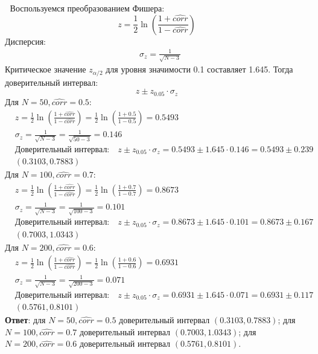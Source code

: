 \documentclass{assignment}
\begin{document}
\begin{enumerate}
\begin{itemize}
    \end{itemize}
    \textcolor{white}{.}
    \start
    Воспользуемся преобразованием Фишера:
    \begin{equation}
        z = \frac{1}{2}\ln (\frac{1+\hat{corr}}{1-\hat{corr}})
    \end{equation}
    Дисперсия:
    \begin{align*}
        &\sigma_z = \frac{1}{\sqrt{N-3}}
    \end{align*}
    Критическое значение $z_{\alpha/2}$ для уровня значимости 0.1 составляет 1.645. Тогда доверительный интервал:
    \begin{equation}
        z \pm z_{0.05}\cdot \sigma_z
    \end{equation}
    Для $N = 50, \hat{corr} = 0.5$:
    \begin{align*}
        &z = \frac{1}{2}\ln (\frac{1+\hat{corr}}{1-\hat{corr}}) = \frac{1}{2}\ln (\frac{1+0.5}{1-0.5}) = 0.5493 \\
        &\sigma_z = \frac{1}{\sqrt{N-3}} = \frac{1}{\sqrt{50-3}} = 0.146 \\
        &\text{Доверительный интервал:}\quad z \pm z_{0.05}\cdot \sigma_z = 0.5493 \pm 1.645 \cdot 0.146 = 0.5493 \pm 0.239 \\
        &(0.3103, 0.7883)
    \end{align*}
    Для $N = 100, \hat{corr} = 0.7$:
    \begin{align*}
        &z = \frac{1}{2}\ln (\frac{1+\hat{corr}}{1-\hat{corr}}) = \frac{1}{2}\ln (\frac{1+0.7}{1-0.7}) = 0.8673 \\
        &\sigma_z = \frac{1}{\sqrt{N-3}} = \frac{1}{\sqrt{100-3}} = 0.101 \\
        &\text{Доверительный интервал:}\quad z \pm z_{0.05}\cdot \sigma_z = 0.8673 \pm 1.645 \cdot 0.101 = 0.8673 \pm 0.167 \\
        &(0.7003, 1.0343)
    \end{align*}
    Для $N = 200, \hat{corr} = 0.6$:
    \begin{align*}
        &z = \frac{1}{2}\ln (\frac{1+\hat{corr}}{1-\hat{corr}}) = \frac{1}{2}\ln (\frac{1+0.6}{1-0.6}) = 0.6931 \\
        &\sigma_z = \frac{1}{\sqrt{N-3}} = \frac{1}{\sqrt{200-3}} = 0.071 \\
        &\text{Доверительный интервал:}\quad z \pm z_{0.05}\cdot \sigma_z = 0.6931 \pm 1.645 \cdot 0.071 = 0.6931 \pm 0.117 \\
        &(0.5761, 0.8101)
    \end{align*}
    \textbf{Ответ}: для $N = 50, \hat{corr} = 0.5$ доверительный интервал $(0.3103, 0.7883)$; для $N = 100, \hat{corr} = 0.7$ доверительный интервал $(0.7003, 1.0343)$; для $N = 200, \hat{corr} = 0.6$ доверительный интервал $(0.5761, 0.8101)$.
    \finish



\end{enumerate}
\end{document}
